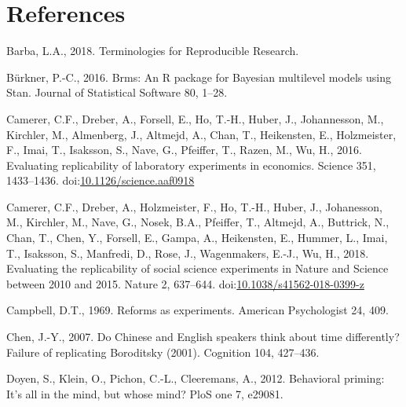 \documentclass[]{elsarticle} %
\newlength{\cslhangindent}
\newlength{\cslentryspacingunit} %
\newenvironment{CSLReferences}[2] %
 {%
  \setlength{\parindent}{0pt}
  \ifodd #1
  \let\oldpar\par
  \def\par{\hangindent=\cslhangindent\oldpar}
  \fi
  \setlength{\parskip}{#2\cslentryspacingunit}
 }%
 {}
\begin{document}
\hypertarget{references}{%
\section*{References}\label{references}}

\hypertarget{refs}{}
\begin{CSLReferences}{1}{0}
\leavevmode{}%
Barba, L.A., 2018. Terminologies for {Reproducible} {Research}.

\leavevmode{}%
Bürkner, P.-C., 2016. Brms: {An} {R} package for {Bayesian} multilevel
models using {Stan}. Journal of Statistical Software 80, 1--28.

\leavevmode{}%
Camerer, C.F., Dreber, A., Forsell, E., Ho, T.-H., Huber, J.,
Johannesson, M., Kirchler, M., Almenberg, J., Altmejd, A., Chan, T.,
Heikensten, E., Holzmeister, F., Imai, T., Isaksson, S., Nave, G.,
Pfeiffer, T., Razen, M., Wu, H., 2016. Evaluating replicability of
laboratory experiments in economics. Science 351, 1433--1436.
doi:\href{https://doi.org/10.1126/science.aaf0918}{10.1126/science.aaf0918}

\leavevmode{}%
Camerer, C.F., Dreber, A., Holzmeister, F., Ho, T.-H., Huber, J.,
Johanesson, M., Kirchler, M., Nave, G., Nosek, B.A., Pfeiffer, T.,
Altmejd, A., Buttrick, N., Chan, T., Chen, Y., Forsell, E., Gampa, A.,
Heikensten, E., Hummer, L., Imai, T., Isaksson, S., Manfredi, D., Rose,
J., Wagenmakers, E.-J., Wu, H., 2018. Evaluating the replicability of
social science experiments in {Nature} and {Science} between 2010 and
2015. Nature 2, 637--644.
doi:\href{https://doi.org/10.1038/s41562-018-0399-z}{10.1038/s41562-018-0399-z}

\leavevmode{}%
Campbell, D.T., 1969. Reforms as experiments. American Psychologist 24,
409.

\leavevmode{}%
Chen, J.-Y., 2007. Do {Chinese} and {English} speakers think about time
differently? {Failure} of replicating {Boroditsky} (2001). Cognition
104, 427--436.

\leavevmode{}%
Doyen, S., Klein, O., Pichon, C.-L., Cleeremans, A., 2012. Behavioral
priming: It's all in the mind, but whose mind? PloS one 7, e29081.


\end{CSLReferences}
\end{document}
